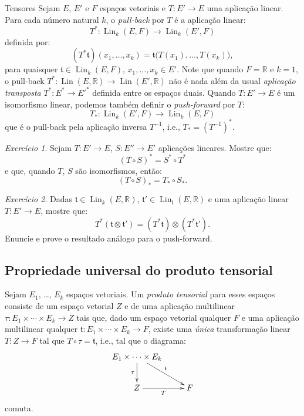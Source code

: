 \documentclass[oneside,11pt]{amsart}
\newcommand{\R}{\mathds R}
\DeclareMathOperator{\Lin}{Lin}
\theoremstyle{remark}\newtheorem{exercise}{Exercício}[section]
\theoremstyle{plain}\newtheorem{teo}{Teorema}[section]
\theoremstyle{plain}\newtheorem{lem}[teo]{Lema}
\theoremstyle{plain}\newtheorem{prop}[teo]{Proposição}
\theoremstyle{definition}\newtheorem{defin}[teo]{Definição}
\theoremstyle{remark}\newtheorem{rem}[teo]{Observação}
\theoremstyle{definition}\newtheorem{example}[teo]{Exemplo}
\numberwithin{equation}{section}
\begin{document}
\begin{section}{Tensores}
Sejam $E$, $E'$ e $F$ espaços vetoriais e $T:E'\to E$ uma aplicação linear. Para cada número natural $k$, o {\em pull-back\/} por $T$ é a aplicação linear:
\[T^*:\Lin_k(E,F)\longrightarrow\Lin_k(E',F)\]
definida por:
\[(T^*\mathfrak t)(x_1,\ldots,x_k)=\mathfrak t\big(T(x_1),\ldots,T(x_k)\big),\]
para quaisquer $\mathfrak t\in\Lin_k(E,F)$, $x_1,\ldots,x_k\in E'$. Note que quando $F=\R$ e $k=1$, o pull-back $T^*:\Lin(E,\R)\to\Lin(E',\R)$ não é nada
além da usual {\em aplicação transposta\/} $T^*:E^*\to{E'}^*$ definida entre os espaços duais.
Quando $T:E'\to E$ é um isomorfismo linear, podemos também definir o {\em push-forward\/}
por $T$:
\[T_*:\Lin_k(E',F)\longrightarrow\Lin_k(E,F)\]
que é o pull-back pela aplicação inversa $T^{-1}$, i.e., $T_*=(T^{-1})^*$.

\begin{exercise}\label{exe:pullbackcomposta}
Sejam $T:E'\to E$, $S:E''\to E'$ aplicações lineares. Mostre que:
\[(T\circ S)^*=S^*\circ T^*\]
e que, quando $T$, $S$ são isomorfismos, então:
\[(T\circ S)_*=T_*\circ S_*.\]
\end{exercise}

\begin{exercise}\label{exe:pullbackhomo}
Dadas $\mathfrak t\in\Lin_k(E,\R)$, $\mathfrak t'\in\Lin_l(E,\R)$ e uma aplicação linear $T:E'\to E$, mostre que:
\[T^*(\mathfrak t\otimes\mathfrak t')=(T^*\mathfrak t)\otimes(T^*\mathfrak t').\]
Enuncie e prove o resultado análogo para o push-forward.
\end{exercise}

\subsection{Propriedade universal do produto tensorial}\label{sub:univtensorial}
Sejam $E_1$, \dots, $E_k$ espaços vetoriais. Um {\em produto tensorial\/} para esses espaços consiste de um espaço vetorial $Z$
e de uma aplicação multilinear $\tau:E_1\times\cdots\times E_k\to Z$ tais que, dado um espaço vetorial qualquer $F$ e uma aplicação multilinear
qualquer $\mathfrak t:E_1\times\cdots\times E_k\to F$, existe uma {\em única\/} transformação linear $T:Z\to F$ tal que $T\circ\tau=\mathfrak t$, i.e., tal que
o diagrama:
\[\xymatrix{%
E_1\times\cdots\times E_k\ar[dr]^{\mathfrak t}\ar[d]_\tau\\
Z\ar[r]_T&F}\]
comuta.


\end{section}
\end{document}
